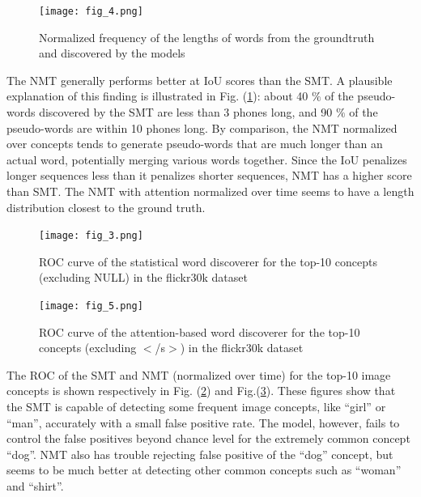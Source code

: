 \documentclass[a4paper]{article}
\begin{document}
\begin{figure}[th]
    \centering
    \texttt{[image: fig\_4.png]}
    \caption{Normalized frequency of the lengths of words from the groundtruth and discovered by the models}
    \label{fig:pseudoword-len}
\end{figure}

The NMT generally performs better at IoU scores than the SMT.
A plausible explanation of this finding is
illustrated in Fig. (\ref{fig:pseudoword-len}): about 40 $\%$ of the pseudo-words discovered by the SMT are less than 3 phones long, and 90 $\%$ of the pseudo-words are within 10 phones long.
By comparison,
the NMT normalized over concepts
tends to generate pseudo-words that are much longer than an actual word, potentially merging various words together. Since the IoU
penalizes 
longer sequences
less than it penalizes shorter sequences, NMT has a higher score than SMT.
The NMT with attention normalized over time seems to have a length distribution closest to the ground truth. 

\begin{figure}[th]
    \centering
    \texttt{[image: fig\_3.png]}
    \caption{ROC curve of the statistical word discoverer for the top-10 concepts (excluding NULL) in the flickr30k dataset}
    \label{fig:smt_roc}
\end{figure}

\begin{figure}[th]
    \centering
    \texttt{[image: fig\_5.png]}
    \caption{ROC curve of the attention-based word discoverer for the top-10 concepts (excluding $<$/s$>$) in the flickr30k dataset}
    \label{fig:nmt_roc}
\end{figure}

The ROC of the SMT and NMT (normalized over time) for the top-10 image concepts is shown respectively in Fig. (\ref{fig:smt_roc}) and Fig.(\ref{fig:nmt_roc}).
These figures show that the SMT is capable of detecting some frequent image concepts,
like ``girl'' or ``man'', accurately with a small false positive rate.
The model, however, fails to control the false positives beyond chance level for the extremely common concept ``dog''.
NMT also has trouble rejecting false positive of the ``dog'' concept,
but seems to be much better at detecting other common concepts such as ``woman'' and ``shirt''.
\end{document}

